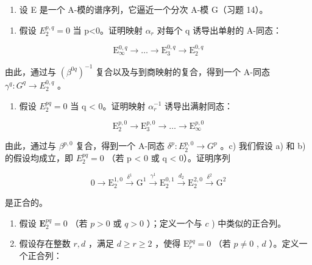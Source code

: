 \begin{enumerate}
\def\labelenumi{\arabic{enumi})}
\setcounter{enumi}{14}
\tightlist
\item
  设 E 是一个 A-模的谱序列，它逼近一个分次 A-模 G（习题 14）。
\end{enumerate}

\begin{enumerate}
\def\labelenumi{\alph{enumi})}
\tightlist
\item
  假设 \(E_{2}^{p,q}=0\) 当 p\textless0。证明映射 \(\alpha_{r}\) 对每个 q 诱导出单射的 A-同态：
\end{enumerate}

\[
\mathrm{E} _ {\infty} ^ {0, q} \rightarrow \dots \rightarrow \mathrm{E} _ {3} ^ {0, q} \rightarrow \mathrm{E} _ {2} ^ {0, q}
\]

由此，通过与 \((\beta^{0q})^{-1}\) 复合以及与到商映射的复合，得到一个 A-同态 \(\gamma^q: G^q \to E_2^{0,q}\) 。

\begin{enumerate}
\def\labelenumi{\alph{enumi})}
\setcounter{enumi}{1}
\tightlist
\item
  假设 \(E_{2}^{pq} = 0\) 当 q \textless{} 0。证明映射 \(\alpha_{r}^{-1}\) 诱导出满射同态：
\end{enumerate}

\[
\mathrm{E} _ {2} ^ {p, 0} \rightarrow \mathrm{E} _ {3} ^ {p, 0} \rightarrow \dots \rightarrow \mathrm{E} _ {\infty} ^ {p, 0}
\]

由此，通过与 \(\beta^{p,0}\) 复合，得到一个 A-同态 \(\delta^p:E_2^{p,0}\to G^p\) 。c) 我们假设 a) 和 b) 的假设均成立，即 \(E_{2}^{pq} = 0\) （若 p \textless{} 0 或 q \textless{} 0）。证明序列

\[
0 \rightarrow \mathrm{E} _ {2} ^ {1, 0} \xrightarrow {\delta^ {1}} \mathrm{G} ^ {1} \xrightarrow {\gamma^ {1}} \mathrm{E} _ {2} ^ {0, 1} \xrightarrow {d _ {2}} \mathrm{E} _ {2} ^ {2, 0} \xrightarrow {\delta^ {2}} \mathrm{G} ^ {2}
\]

是正合的。

\begin{enumerate}
\def\labelenumi{\alph{enumi})}
\setcounter{enumi}{3}
\item
  假设 \(\mathbf{E}_2^{pq} = 0\) （若 \(p > 0\) 或 \(q > 0\) ）；定义一个与 \(c\) ) 中类似的正合列。
\item
  假设存在整数 \(r, d\) ，满足 \(d \geqslant r \geqslant 2\) ，使得 \(\mathrm{E}_{r}^{pq} = 0\) （若 \(p \neq 0\) , \(d\) ）。定义一个正合列：
\end{enumerate}

